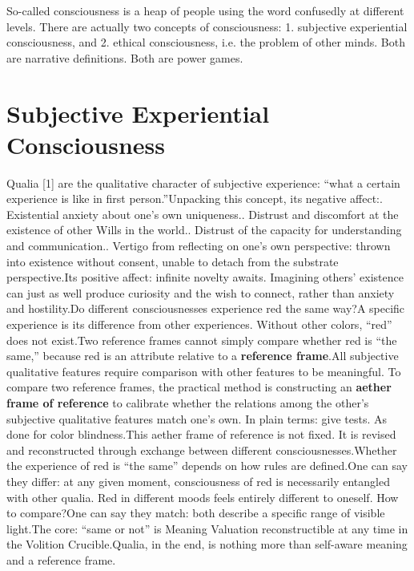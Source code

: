 \documentclass[11pt]{article}
\renewcommand{\\}[1][\mynewlineskip]{\oldnewline[#1]}
\begin{document}
\vspace{1em}
So-called consciousness is a heap of people using the word confusedly at different levels. There are actually two concepts of consciousness: 1. subjective experiential consciousness, and 2. ethical consciousness, i.e. the problem of other minds. Both are narrative definitions. Both are power games.

\section{Subjective Experiential Consciousness}
Qualia [1] are the qualitative character of subjective experience: ``what a certain experience is like in first person.''\\
Unpacking this concept, its negative affect:\\
1. Existential anxiety about one's own uniqueness.\\
2. Distrust and discomfort at the existence of other Wills in the world.\\
3. Distrust of the capacity for understanding and communication.\\
4. Vertigo from reflecting on one's own perspective: thrown into existence without consent, unable to detach from the substrate perspective.\\
Its positive affect: infinite novelty awaits. Imagining others' existence can just as well produce curiosity and the wish to connect, rather than anxiety and hostility.\\
Do different consciousnesses experience red the same way?\\
A specific experience is its difference from other experiences. Without other colors, ``red'' does not exist.\\
Two reference frames cannot simply compare whether red is ``the same,'' because red is an attribute relative to a \textbf{reference frame}.\\
All subjective qualitative features require comparison with other features to be meaningful. To compare two reference frames, the practical method is constructing an \textbf{aether frame of reference} to calibrate whether the relations among the other's subjective qualitative features match one's own. In plain terms: give tests. As done for color blindness.\\
This aether frame of reference is not fixed. It is revised and reconstructed through exchange between different consciousnesses.\\
Whether the experience of red is ``the same'' depends on how rules are defined.\\
One can say they differ: at any given moment, consciousness of red is necessarily entangled with other qualia. Red in different moods feels entirely different to oneself. How to compare?\\
One can say they match: both describe a specific range of visible light.\\
The core: ``same or not'' is Meaning Valuation reconstructible at any time in the Volition Crucible.\\
Qualia, in the end, is nothing more than self-aware meaning and a reference frame.
\end{document}
